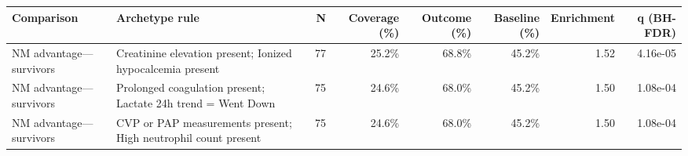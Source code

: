 \documentclass[border=0pt]{standalone}
\begin{document}
\begin{adjustbox}{width=\textwidth}
\begin{tabular}{@{}llrrrrrr@{}}
\toprule
Comparison & Archetype rule & N & Coverage (\%) & Outcome (\%) & Baseline (\%) & Enrichment & q (BH-FDR) \\
\midrule
NM advantage—survivors & Creatinine elevation present; Ionized hypocalcemia present & 77 & 25.2\% & 68.8\% & 45.2\% & 1.52 & 4.16e-05 \\
NM advantage—survivors & Prolonged coagulation present; Lactate 24h trend = Went Down & 75 & 24.6\% & 68.0\% & 45.2\% & 1.50 & 1.08e-04 \\
NM advantage—survivors & CVP or PAP measurements present; High neutrophil count present & 75 & 24.6\% & 68.0\% & 45.2\% & 1.50 & 1.08e-04 \\
\bottomrule
\end{tabular}
\end{adjustbox}
\end{document}
